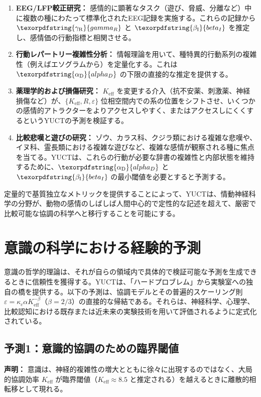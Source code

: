 \documentclass[12pt,a4paper]{article}
\DeclareRobustCommand{\alD}{\texorpdfstring{\ensuremath{\alpha_{\mathrm{D}}}}{alpha_D}}
\DeclareRobustCommand{\beI}{\texorpdfstring{\ensuremath{\beta_{\mathrm{I}}}}{beta_I}}
\DeclareRobustCommand{\gaR}{\texorpdfstring{\ensuremath{\gamma_{\mathrm{R}}}}{gamma_R}}
\begin{document}
	\begin{enumerate}
		\item \textbf{EEG/LFP較正研究：} 感情的に顕著なタスク（遊び、脅威、分離など）中に複数の種にわたって標準化されたEEG記録を実施する。これらの記録から \(\gaR\) と \(\beI\) を推定し、感情価の行動指標と相関させる。
		\item \textbf{行動レパートリー複雑性分析：} 情報理論を用いて、種特異的行動系列の複雑性（例えばエソグラムから）を定量化する。これは \(\alD\) の下限の直接的な推定を提供する。
		\item \textbf{薬理学的および損傷研究：} \(K_{\mathrm{eff}}\) を変更する介入（抗不安薬、刺激薬、神経損傷など）が、\(\{K_{\mathrm{eff}}, R, \varepsilon\}\) 位相空間内での系の位置をシフトさせ、いくつかの感情的アトラクターをよりアクセスしやすく、またはアクセスしにくくするというYUCTの予測を検証する。
		\item \textbf{比較悲嘆と遊びの研究：} ゾウ、カラス科、クジラ類における複雑な悲嘆や、イヌ科、霊長類における複雑な遊びなど、複雑な感情が観察される種に焦点を当てる。YUCTは、これらの行動が必要な辞書の複雑性と内部状態を維持するために、\(\alD\) と \(\beI\) の最小閾値を必要とすると予測する。
	\end{enumerate}
	
	定量的で基質独立なメトリックを提供することによって、YUCTは、情動神経科学の分野が、動物の感情のしばしば人間中心的で定性的な記述を超えて、厳密で比較可能な協調の科学へと移行することを可能にする。
	
	\section{意識の科学における経験的予測}
	
	意識の哲学的理論は、それが自らの領域内で具体的で検証可能な予測を生成できるときに信頼性を獲得する。YUCTは、「ハードプロブレム」から実験室への独自の橋を提供する。以下の予測は、協調モデルとその普遍的スケーリング則 \(\varepsilon = \kappa_c \alpha K_{\mathrm{eff}}^{-\beta}\)（\(\beta = 2/3\)）の直接的な帰結である。それらは、神経科学、心理学、比較認知における既存または近未来の実験技術を用いて評価されるように定式化されている。
	
	\subsection{予測1：意識的協調のための臨界閾値}
	
	\textbf{声明：} 意識は、神経的複雑性の増大とともに徐々に出現するのではなく、大局的協調効率 \(K_{\mathrm{eff}}\) が臨界閾値（\(K_{\mathrm{eff}} \approx 8.5\) と推定される）を越えるときに離散的相転移として現れる。
	
\end{document}
